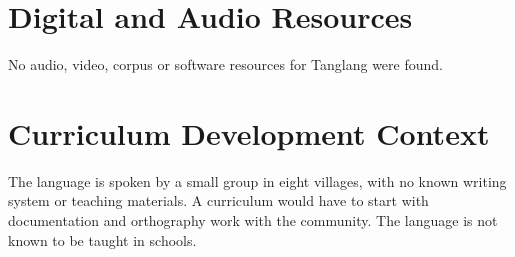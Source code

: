 \documentclass[12pt]{article}
\begin{document}
\section{Digital and Audio Resources}
No audio, video, corpus or software resources for Tanglang were found.

\section{Curriculum Development Context}
The language is spoken by a small group in eight villages, with no known writing system or teaching materials. A curriculum would have to start with documentation and orthography work with the community. The language is not known to be taught in schools.
\end{document}
